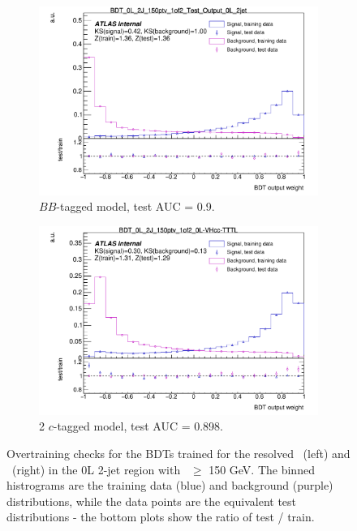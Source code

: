 \begin{figure}[h!]
    \hspace{-0.3cm}
    \begin{subfigure}[b]{0.49\textwidth}
        \centering
      \includegraphics[width=\textwidth]{Images/VH/Discriminants/OvertrainCheck_BDT_0L_2J_150ptv_1of2_Test_Output_0L_2jet.pdf}
    \caption{$BB$-tagged model, test AUC = 0.9.} 
    \end{subfigure}
    \begin{subfigure}[b]{0.49\textwidth}
        \centering
      \includegraphics[width=\textwidth]{Images/VH/Discriminants/OvertrainCheck_BDT_0L_2J_150ptv_1of2_0L-VHcc-TTTL.pdf}
      \caption{2 $c$-tagged model, test AUC = 0.898.}
    \end{subfigure}
    \caption{Overtraining checks for the BDTs trained for the resolved \vhb\ (left) and \vhc\ (right) in the 0L 2-jet region with \ptv\ $\geq$ 150 GeV. The binned histrograms are the training data (blue) and background (purple) distributions, while the data points are the equivalent test distributions - the bottom plots show the ratio of test / train.}
    \label{fig:overtrainingCheck}
\end{figure} 

